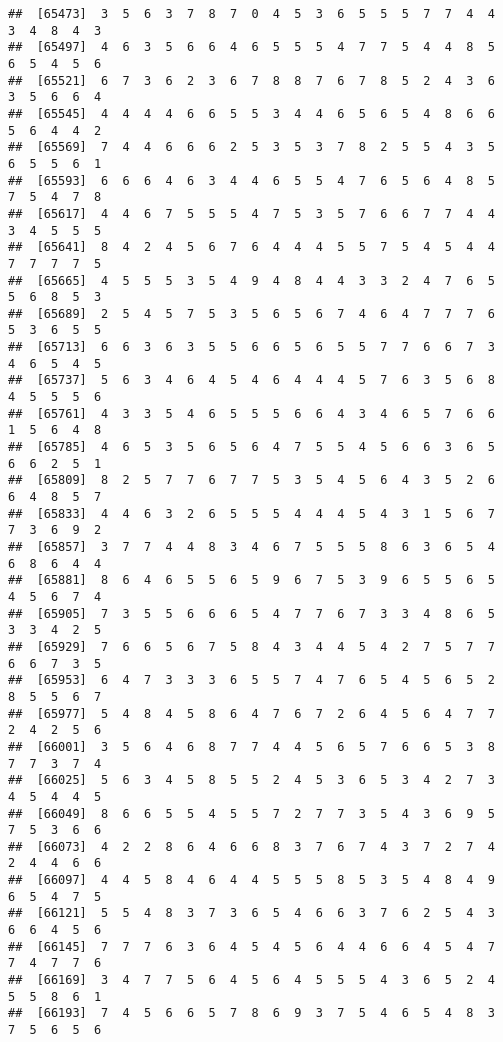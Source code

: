 \documentclass[
]{book}
\begin{document}
\begin{verbatim}
##  [65473]  3  5  6  3  7  8  7  0  4  5  3  6  5  5  5  7  7  4  4  3  4  8  4  3
##  [65497]  4  6  3  5  6  6  4  6  5  5  5  4  7  7  5  4  4  8  5  6  5  4  5  6
##  [65521]  6  7  3  6  2  3  6  7  8  8  7  6  7  8  5  2  4  3  6  3  5  6  6  4
##  [65545]  4  4  4  4  6  6  5  5  3  4  4  6  5  6  5  4  8  6  6  5  6  4  4  2
##  [65569]  7  4  4  6  6  6  2  5  3  5  3  7  8  2  5  5  4  3  5  6  5  5  6  1
##  [65593]  6  6  6  4  6  3  4  4  6  5  5  4  7  6  5  6  4  8  5  7  5  4  7  8
##  [65617]  4  4  6  7  5  5  5  4  7  5  3  5  7  6  6  7  7  4  4  3  4  5  5  5
##  [65641]  8  4  2  4  5  6  7  6  4  4  4  5  5  7  5  4  5  4  4  7  7  7  7  5
##  [65665]  4  5  5  5  3  5  4  9  4  8  4  4  3  3  2  4  7  6  5  5  6  8  5  3
##  [65689]  2  5  4  5  7  5  3  5  6  5  6  7  4  6  4  7  7  7  6  5  3  6  5  5
##  [65713]  6  6  3  6  3  5  5  6  6  5  6  5  5  7  7  6  6  7  3  4  6  5  4  5
##  [65737]  5  6  3  4  6  4  5  4  6  4  4  4  5  7  6  3  5  6  8  4  5  5  5  6
##  [65761]  4  3  3  5  4  6  5  5  5  6  6  4  3  4  6  5  7  6  6  1  5  6  4  8
##  [65785]  4  6  5  3  5  6  5  6  4  7  5  5  4  5  6  6  3  6  5  6  6  2  5  1
##  [65809]  8  2  5  7  7  6  7  7  5  3  5  4  5  6  4  3  5  2  6  6  4  8  5  7
##  [65833]  4  4  6  3  2  6  5  5  5  4  4  4  5  4  3  1  5  6  7  7  3  6  9  2
##  [65857]  3  7  7  4  4  8  3  4  6  7  5  5  5  8  6  3  6  5  4  6  8  6  4  4
##  [65881]  8  6  4  6  5  5  6  5  9  6  7  5  3  9  6  5  5  6  5  4  5  6  7  4
##  [65905]  7  3  5  5  6  6  6  5  4  7  7  6  7  3  3  4  8  6  5  3  3  4  2  5
##  [65929]  7  6  6  5  6  7  5  8  4  3  4  4  5  4  2  7  5  7  7  6  6  7  3  5
##  [65953]  6  4  7  3  3  3  6  5  5  7  4  7  6  5  4  5  6  5  2  8  5  5  6  7
##  [65977]  5  4  8  4  5  8  6  4  7  6  7  2  6  4  5  6  4  7  7  2  4  2  5  6
##  [66001]  3  5  6  4  6  8  7  7  4  4  5  6  5  7  6  6  5  3  8  7  7  3  7  4
##  [66025]  5  6  3  4  5  8  5  5  2  4  5  3  6  5  3  4  2  7  3  4  5  4  4  5
##  [66049]  8  6  6  5  5  4  5  5  7  2  7  7  3  5  4  3  6  9  5  7  5  3  6  6
##  [66073]  4  2  2  8  6  4  6  6  8  3  7  6  7  4  3  7  2  7  4  2  4  4  6  6
##  [66097]  4  4  5  8  4  6  4  4  5  5  5  8  5  3  5  4  8  4  9  6  5  4  7  5
##  [66121]  5  5  4  8  3  7  3  6  5  4  6  6  3  7  6  2  5  4  3  6  6  4  5  6
##  [66145]  7  7  7  6  3  6  4  5  4  5  6  4  4  6  6  4  5  4  7  7  4  7  7  6
##  [66169]  3  4  7  7  5  6  4  5  6  4  5  5  5  4  3  6  5  2  4  5  5  8  6  1
##  [66193]  7  4  5  6  6  5  7  8  6  9  3  7  5  4  6  5  4  8  3  7  5  6  5  6

\end{verbatim}
\end{document}
